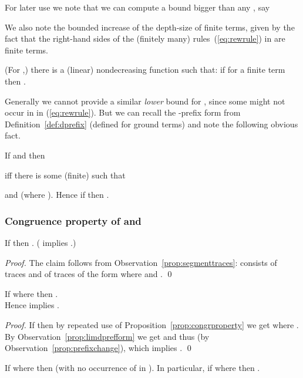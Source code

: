 \documentclass[12pt]{article}
\begin{document}
\noindent
For later use we note that we can compute a bound bigger than any
, say

We also note the bounded increase of the depth-size of finite terms, 
given by the fact that the right-hand sides of 
the (finitely many) rules~(\ref{eq:rewrule}) in  are finite terms.


\begin{observ}\label{prop:binc}
(For ,) there is a (linear) nondecreasing function
  such that:
if \mbox{} for a finite term  
then .
\end{observ}
Generally we cannot provide a similar \emph{lower} 
bound for , 
since some  might not occur in  in (\ref{eq:rewrule}).
But we can 
recall the -prefix form from Definition~\ref{def:dprefix}
(defined for ground terms) and note the following obvious fact.

\begin{observ}\label{prop:prefixchange}
If  and    then

iff there is some (finite)   such that 
 
and
 (where ). 
Hence if  then  .
\end{observ}


\subsubsection*{Congruence property of  and }


\begin{prop}\label{prop:congrproperty}
If  then . 
( implies .)
\end{prop}

\begin{proof}
The claim follows from Observation~\ref{prop:segmenttraces}:
 consists of traces  
and of traces of the form
 where  and .
\qed
\end{proof}

\noindent


\begin{prop}\label{prop:congrlim}
If  where  then 
.
\\
Hence  implies .
\end{prop}

\begin{proof}
If 
then by repeated use of Proposition~\ref{prop:congrproperty} we get
 where . 
By Observation~\ref{prop:limdprefform} we get
 and
thus 
(by Observation~\ref{prop:prefixchange}), which implies
.
\qed
\end{proof}

\begin{cor}\label{prop:corcongrlimequat}
If  where  then
 (with no occurrence of  in 
). In particular, 
if  where   then  
.
\end{cor}
\end{document}
